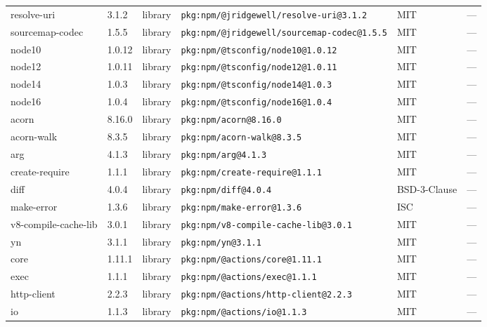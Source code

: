 \documentclass[11pt,a4paper]{article}
\begin{document}
\begin{longtable}{|p{4cm}|p{2cm}|p{1.6cm}|p{5cm}|p{1.5cm}|p{3.5cm}|}
\raggedright resolve-uri & 3.1.2 & library & \small\texttt{pkg:npm/@jridgewell/resolve-uri@3.1.2} & MIT & \small — \\
\raggedright sourcemap-codec & 1.5.5 & library & \small\texttt{pkg:npm/@jridgewell/sourcemap-codec@1.5.5} & MIT & \small — \\
\raggedright node10 & 1.0.12 & library & \small\texttt{pkg:npm/@tsconfig/node10@1.0.12} & MIT & \small — \\
\raggedright node12 & 1.0.11 & library & \small\texttt{pkg:npm/@tsconfig/node12@1.0.11} & MIT & \small — \\
\raggedright node14 & 1.0.3 & library & \small\texttt{pkg:npm/@tsconfig/node14@1.0.3} & MIT & \small — \\
\raggedright node16 & 1.0.4 & library & \small\texttt{pkg:npm/@tsconfig/node16@1.0.4} & MIT & \small — \\
\raggedright acorn & 8.16.0 & library & \small\texttt{pkg:npm/acorn@8.16.0} & MIT & \small — \\
\raggedright acorn-walk & 8.3.5 & library & \small\texttt{pkg:npm/acorn-walk@8.3.5} & MIT & \small — \\
\raggedright arg & 4.1.3 & library & \small\texttt{pkg:npm/arg@4.1.3} & MIT & \small — \\
\raggedright create-require & 1.1.1 & library & \small\texttt{pkg:npm/create-require@1.1.1} & MIT & \small — \\
\raggedright diff & 4.0.4 & library & \small\texttt{pkg:npm/diff@4.0.4} & BSD-3-Clause & \small — \\
\raggedright make-error & 1.3.6 & library & \small\texttt{pkg:npm/make-error@1.3.6} & ISC & \small — \\
\raggedright v8-compile-cache-lib & 3.0.1 & library & \small\texttt{pkg:npm/v8-compile-cache-lib@3.0.1} & MIT & \small — \\
\raggedright yn & 3.1.1 & library & \small\texttt{pkg:npm/yn@3.1.1} & MIT & \small — \\
\raggedright core & 1.11.1 & library & \small\texttt{pkg:npm/@actions/core@1.11.1} & MIT & \small — \\
\raggedright exec & 1.1.1 & library & \small\texttt{pkg:npm/@actions/exec@1.1.1} & MIT & \small — \\
\raggedright http-client & 2.2.3 & library & \small\texttt{pkg:npm/@actions/http-client@2.2.3} & MIT & \small — \\
\raggedright io & 1.1.3 & library & \small\texttt{pkg:npm/@actions/io@1.1.3} & MIT & \small — \\

\end{longtable}
\end{document}
